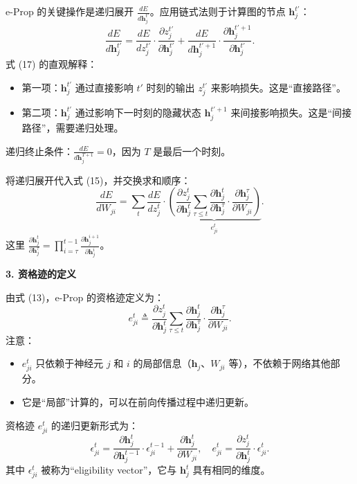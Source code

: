 \documentclass[journal,12pt,onecolumn]{IEEEtran}
\begin{document}
e-Prop 的关键操作是递归展开 $\frac{dE}{d\mathbf{h}_j^{t'}}$。应用链式法则于计算图的节点 $\mathbf{h}_j^{t'}$：
\[
\frac{dE}{d\mathbf{h}_j^{t'}} = \frac{dE}{dz_j^{t'}} \cdot \frac{\partial z_j^{t'}}{\partial \mathbf{h}_j^{t'}} + \frac{dE}{d\mathbf{h}_j^{t'+1}} \cdot \frac{\partial \mathbf{h}_j^{t'+1}}{\partial \mathbf{h}_j^{t'}}. \tag{17}
\]
式 (17) 的直观解释：
\begin{itemize}
    \item 第一项：$\mathbf{h}_j^{t'}$ 通过直接影响 $t'$ 时刻的输出 $z_j^{t'}$ 来影响损失。这是“直接路径”。
    \item 第二项：$\mathbf{h}_j^{t'}$ 通过影响下一时刻的隐藏状态 $\mathbf{h}_j^{t'+1}$ 来间接影响损失。这是“间接路径”，需要递归处理。
\end{itemize}

递归终止条件：$\frac{dE}{d\mathbf{h}_j^{T+1}} = 0$，因为 $T$ 是最后一个时刻。

将递归展开代入式 (15)，并交换求和顺序：
\[
\frac{dE}{dW_{ji}} = \sum_t \frac{dE}{dz_j^t} \cdot 
\underbrace{\left( \frac{\partial z_j^t}{\partial \mathbf{h}_j^t} \sum_{\tau \le t} \frac{\partial \mathbf{h}_j^t}{\partial \mathbf{h}_j^{\tau}} \cdot \frac{\partial \mathbf{h}_j^{\tau}}{\partial W_{ji}} \right)}_{e_{ji}^t}. \tag{13}
\]
这里 $\frac{\partial \mathbf{h}_j^t}{\partial \mathbf{h}_j^{\tau}} = \prod_{i=\tau}^{t-1} \frac{\partial \mathbf{h}_j^{i+1}}{\partial \mathbf{h}_j^i}$。

\medskip\noindent\textbf{3. 资格迹的定义}

由式 (13)，e-Prop 的资格迹定义为：
\[
e_{ji}^t \triangleq \frac{\partial z_j^t}{\partial \mathbf{h}_j^t} \sum_{\tau \le t} \frac{\partial \mathbf{h}_j^t}{\partial \mathbf{h}_j^{\tau}} \cdot \frac{\partial \mathbf{h}_j^{\tau}}{\partial W_{ji}}. \tag{18}
\]
注意：
\begin{itemize}
    \item $e_{ji}^t$ 只依赖于神经元 $j$ 和 $i$ 的局部信息（$\mathbf{h}_j$、$W_{ji}$ 等），不依赖于网络其他部分。
    \item 它是“局部”计算的，可以在前向传播过程中递归更新。
\end{itemize}

资格迹 $e_{ji}^t$ 的递归更新形式为：
\[
\epsilon_{ji}^{t} = \frac{\partial \mathbf{h}_j^t}{\partial \mathbf{h}_j^{t-1}} \cdot \epsilon_{ji}^{t-1} + \frac{\partial \mathbf{h}_j^t}{\partial W_{ji}}, \quad e_{ji}^t = \frac{\partial z_j^t}{\partial \mathbf{h}_j^t} \cdot \epsilon_{ji}^{t}. \tag{14}
\]
其中 $\epsilon_{ji}^{t}$ 被称为“eligibility vector”，它与 $\mathbf{h}_j^t$ 具有相同的维度。
\end{document}
